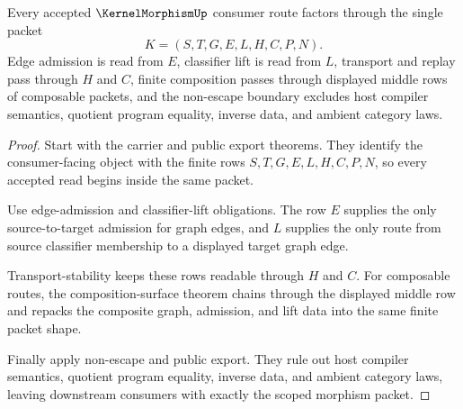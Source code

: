 \begin{theorem}
\label{thm:kernel-morphism-scoped-consumer-packet}
Every accepted $\KernelMorphismUp$ consumer route factors through the single packet
$$
K=(S,T,G,E,L,H,C,P,N).
$$
Edge admission is read from $E$, classifier lift is read from $L$, transport and replay pass through $H$ and $C$, finite composition passes through displayed middle rows of composable packets, and the non-escape boundary excludes host compiler semantics, quotient program equality, inverse data, and ambient category laws.
\end{theorem}
\begin{proof}
Start with the carrier and public export theorems. They identify the consumer-facing object with the finite rows $S,T,G,E,L,H,C,P,N$, so every accepted read begins inside the same packet.

Use edge-admission and classifier-lift obligations. The row $E$ supplies the only source-to-target admission for graph edges, and $L$ supplies the only route from source classifier membership to a displayed target graph edge.

Transport-stability keeps these rows readable through $H$ and $C$. For composable routes, the composition-surface theorem chains through the displayed middle row and repacks the composite graph, admission, and lift data into the same finite packet shape.

Finally apply non-escape and public export. They rule out host compiler semantics, quotient program equality, inverse data, and ambient category laws, leaving downstream consumers with exactly the scoped morphism packet.
\end{proof}


